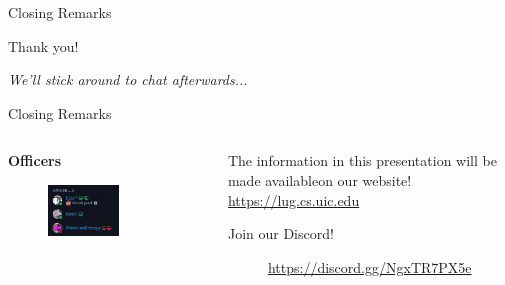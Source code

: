\documentclass{beamer}
\begin{document}
\begin{frame}{Closing Remarks}
	\begin{center}
		{\Huge Thank you!}

		\textit{We'll stick around to chat afterwards...}
	\end{center}
\end{frame}

\begin{frame}{Closing Remarks}
	\begin{columns}
		\begin{column}{0.5\textwidth}
			\textbf{Officers}
			\begin{figure}
				\centering
				\includegraphics[width=0.60\textwidth]{officers.png}
			\end{figure}
		\end{column}
		\begin{column}{0.5\textwidth}
			The information in this presentation will be made
			available\footnotemark on our website!\\
			\url{https://lug.cs.uic.edu}
			
			\bigskip
			Join our Discord!

			\begin{figure}
				\centering
				
				\caption{\url{https://discord.gg/NgxTR7PX5e}}
			\end{figure}
		\end{column}
	\end{columns}

\end{frame}
\end{document}
